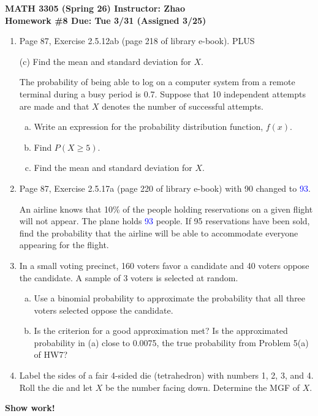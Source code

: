 \documentclass[12pt]{article}
\begin{document}
\begin{center}
  \textbf{\large MATH 3305 (Spring 26) \hfill Instructor: Zhao}\\[4pt]
  \textbf{\large Homework \#8 \hfill Due: Tue 3/31 (Assigned 3/25)}
\end{center}

\bigskip

\begin{enumerate}
  \item Page 87, Exercise 2.5.12ab (page 218 of library e-book). PLUS

    (c) Find the mean and standard deviation for $X$.

    The probability of being able to log on a computer system from a remote terminal during a busy period is 0.7. Suppose that 10 independent attempts are made and that $X$ denotes the number of successful attempts.
    \begin{enumerate}[(a)]
      \item Write an expression for the probability distribution function, $f(x)$.
      \item Find $P(X \ge 5)$.
      \item Find the mean and standard deviation for $X$.
    \end{enumerate}

  \item Page 87, Exercise 2.5.17a (page 220 of library e-book) with 90 changed to \textcolor{blue}{93}.

    An airline knows that 10\% of the people holding reservations on a given flight will not appear. The plane holds \textcolor{blue}{93} people. If 95 reservations have been sold, find the probability that the airline will be able to accommodate everyone appearing for the flight.

  \item In a small voting precinct, 160 voters favor a candidate and 40 voters oppose the candidate. A sample of 3 voters is selected at random.
    \begin{enumerate}[(a)]
      \item Use a binomial probability to approximate the probability that all three voters selected oppose the candidate.
      \item Is the criterion for a good approximation met? Is the approximated probability in (a) close to 0.0075, the true probability from Problem 5(a) of HW7?
    \end{enumerate}

  \item Label the sides of a fair 4-sided die (tetrahedron) with numbers 1, 2, 3, and 4. Roll the die and let $X$ be the number facing down. Determine the MGF of $X$.
\end{enumerate}

\begin{center}
  \textbf{\large Show work!}
\end{center}
\end{document}
